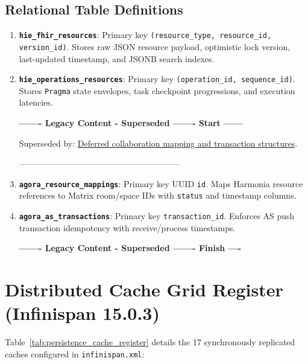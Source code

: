 \subsection{Relational Table Definitions}
\begin{enumerate}
    \item \textbf{\nolinkurl{hie_fhir_resources}}: Primary key \nolinkurl{(resource_type, resource_id, version_id)}. Stores raw JSON resource payload, optimistic lock version, last-updated timestamp, and JSONB search indexes.
    \item \textbf{\nolinkurl{hie_operations_resources}}: Primary key \nolinkurl{(operation_id, sequence_id)}. Stores \nolinkurl{Pragma} state envelopes, task checkpoint progressions, and execution latencies.

\par\noindent\textbf{------- Legacy Content - Superseded ------- Start ------}
\par\noindent Superseded by: \href{../../markdown/05-information-systems-architecture/agora-omilia-collaboration.md\#information-ownership}{Deferred collaboration mapping and transaction structures}.
\par\noindent ---------------------------------------------------------

    \item \textbf{\nolinkurl{agora_resource_mappings}}: Primary key UUID \nolinkurl{id}. Maps Harmonia resource references to Matrix room/space IDs with \nolinkurl{status} and timestamp columns.
    \item \textbf{\nolinkurl{agora_as_transactions}}: Primary key \nolinkurl{transaction_id}. Enforces AS push transaction idempotency with receive/process timestamps.

\par\noindent\textbf{------- Legacy Content - Superseded ------- Finish ----}

\end{enumerate}

\section{Distributed Cache Grid Register (Infinispan 15.0.3)}

Table~\ref{tab:persistence_cache_register} details the 17 synchronously replicated caches configured in \nolinkurl{infinispan.xml}:

